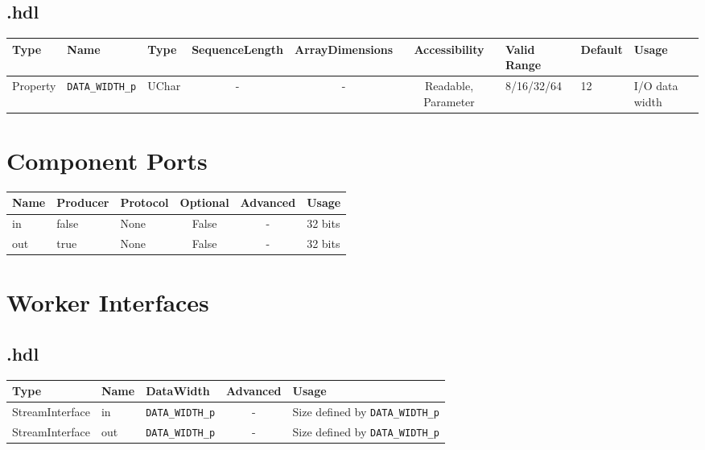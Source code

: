 \begin{landscape}
\subsection*{\comp.hdl}
\begin{scriptsize}
	\begin{tabular}{|p{1.5cm}|p{2.5cm}|p{1cm}|c|c|c|p{2cm}|p{1cm}|p{5cm}|}
		\hline
		\rowcolor{blue}
		Type     & Name                      & Type  & SequenceLength & ArrayDimensions & Accessibility       & Valid Range & Default & Usage                                      \\
		\hline
		Property & \verb+DATA_WIDTH_p+   & UChar & -              & -               & Readable, Parameter & 8/16/32/64        & 12      & I/O data width                   \\
		\hline
	\end{tabular}
\end{scriptsize}

\section*{Component Ports}
\begin{scriptsize}
\begin{tabular}{|M{2cm}|M{1.5cm}|M{4cm}|c|c|M{9cm}|}
\hline
{}
Name & Producer & Protocol & Optional & Advanced & Usage
\\
\hline
in & false & None& False & - & 32 bits\\
\hline
out & true & None& False & - & 32 bits\\
\hline
\end{tabular}
\end{scriptsize}

\section*{Worker Interfaces}
\subsection*{\comp.hdl}
\begin{scriptsize}
	\begin{tabular}{|M{2cm}|M{1.5cm}|M{4cm}|c|M{12cm}|}
		\hline
		Type            & Name & DataWidth            & Advanced & Usage                                       \\
		\hline
		StreamInterface & in   & \verb+DATA_WIDTH_p+ & -        & Size defined by \verb+DATA_WIDTH_p+        \\
		\hline
		StreamInterface & out  & \verb+DATA_WIDTH_p+ & -        & Size defined by \verb+DATA_WIDTH_p+ \\
		\hline
	\end{tabular}
\end{scriptsize}
\end{landscape}

